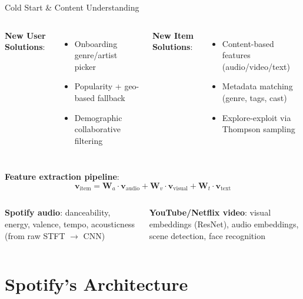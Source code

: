 \documentclass[aspectratio=169, 11pt]{beamer}
\begin{document}
\begin{frame}{Cold Start \& Content Understanding}
\small
\begin{columns}[T]
\textbf{New User Solutions}:
\begin{itemize}
    \item Onboarding genre/artist picker
    \item Popularity + geo-based fallback
    \item Demographic collaborative filtering
\end{itemize}

\textbf{New Item Solutions}:
\begin{itemize}
    \item Content-based features (audio/video/text)
    \item Metadata matching (genre, tags, cast)
    \item Explore-exploit via Thompson sampling
\end{itemize}
\end{columns}

\vspace{0.15cm}
\textbf{Feature extraction pipeline}:
\begin{equation*}
\mathbf{v}_{\text{item}} = \mathbf{W}_a\!\cdot\!\mathbf{v}_{\text{audio}} + \mathbf{W}_v\!\cdot\!\mathbf{v}_{\text{visual}} + \mathbf{W}_t\!\cdot\!\mathbf{v}_{\text{text}}
\end{equation*}

\begin{columns}[T]
\small
\textbf{Spotify audio}: danceability, energy, valence, tempo, acousticness (from raw STFT $\to$ CNN)

\small
\textbf{YouTube/Netflix video}: visual embeddings (ResNet), audio embeddings, scene detection, face recognition
\end{columns}
\end{frame}

\section{Spotify's Architecture}
\end{document}
